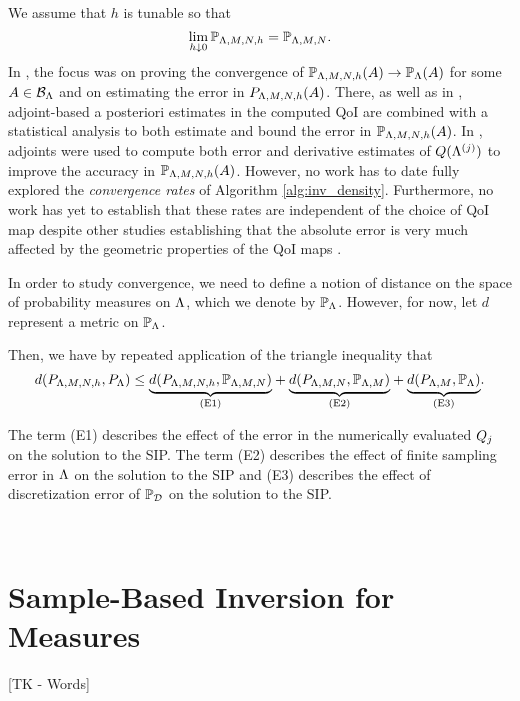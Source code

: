 We assume that $h$ is tunable so that
\[
\lim\limits_{h \downarrow 0} \mathbb{P}_{{\Lambda}, M, N, h} = \mathbb{P}_{{\Lambda}, M, N}.
\]
In \cite{BM17}, the focus was on proving the convergence of $\mathbb{P}_{{\Lambda}, M, N, h} (A) \to \mathbb{P}_{{\Lambda}} (A)$ for some $A\in \mathcal{B}_{{\Lambda}}$ and on estimating the error in $P_{{\Lambda}, M, N, h}(A)$.
There, as well as in \cite{BGE+15}, adjoint-based a posteriori estimates in the computed QoI are combined with a statistical analysis to both estimate and bound the error in $\mathbb{P}_{{\Lambda}, M, N, h} (A)$.
In \cite{BM17}, adjoints were used to compute both error and derivative estimates of $Q({\Lambda}^{(j)})$ to improve the accuracy in $\mathbb{P}_{{\Lambda}, M, N, h} (A)$.
However, no work has to date fully explored the \emph{convergence rates} of Algorithm \ref{alg:inv_density}.
Furthermore, no work has yet to establish that these rates are independent of the choice of QoI map despite other studies establishing that the absolute error is very much affected by the geometric properties of the QoI maps \cite{BE13}.

In order to study convergence, we need to define a notion of distance on the space of probability measures on ${\Lambda}$, which we denote by $\mathbb{P}_{\Lambda}$. 
However, for now, let $d$ represent a metric on $\mathbb{P}_{\Lambda}$.

Then, we have by repeated application of the triangle inequality that
\begin{equation}
\label{eq:triangleineq}
d(P_{{\Lambda}, M, N, h}, P_{\Lambda}) \leq 
\underset{ \text{(E1)} }{\underbrace{d(P_{{\Lambda}, M, N, h},\mathbb{P}_{{\Lambda}, M, N})}} + 
\underset{ \text{(E2)} }{\underbrace{d(P_{{\Lambda}, M, N}, \mathbb{P}_{{\Lambda}, M}) }}+ 
\underset{ \text{(E3)} }{\underbrace{d(P_{{\Lambda}, M}, \mathbb{P}_{\Lambda}) }}.
\end{equation}

The term (E1) describes the effect of the error in the numerically evaluated $Q_j$ on the solution to the SIP. 
The term (E2) describes the effect of finite sampling error in ${\Lambda}$ on the solution to the SIP and (E3) describes the effect of discretization error of $\mathbb{P}_{\mathcal{D}}$ on the solution to the SIP. 






\
\section{Sample-Based Inversion for Measures}\label{sec:ch02-sample}
[TK - Words]

